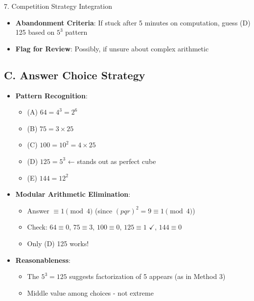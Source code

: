 \documentclass[12pt]{article}
\begin{document}
\begin{competitionbox}{7. Competition Strategy Integration}
\begin{itemize}[leftmargin=*]
    \item \textbf{Abandonment Criteria}: If stuck after 5 minutes on computation, guess (D) 125 based on $5^3$ pattern
    
    \item \textbf{Flag for Review}: Possibly, if unsure about complex arithmetic
\end{itemize}

\subsection*{C. Answer Choice Strategy}
\begin{itemize}[leftmargin=*]
    \item \textbf{Pattern Recognition}:
    \begin{itemize}
        \item (A) $64 = 4^3 = 2^6$
        \item (B) $75 = 3 \times 25$
        \item (C) $100 = 10^2 = 4 \times 25$
        \item (D) $125 = 5^3$ ← stands out as perfect cube
        \item (E) $144 = 12^2$
    \end{itemize}
    
    \item \textbf{Modular Arithmetic Elimination}:
    \begin{itemize}
        \item Answer $\equiv 1 \pmod{4}$ (since $(pqr)^2 = 9 \equiv 1 \pmod{4}$)
        \item Check: $64 \equiv 0$, $75 \equiv 3$, $100 \equiv 0$, $125 \equiv 1$ $\checkmark$, $144 \equiv 0$
        \item Only (D) 125 works!
    \end{itemize}
    
    \item \textbf{Reasonableness}:
    \begin{itemize}
        \item The $5^3 = 125$ suggests factorization of 5 appears (as in Method 3)
        \item Middle value among choices - not extreme
    \end{itemize}
\end{itemize}


\end{competitionbox}
\end{document}
